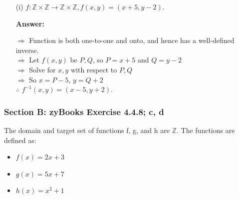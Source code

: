 \documentclass[14pt]{extreport}
\newcommand{\answer}[0]{\medskip \textbf{Answer:} \medskip}
\begin{document}
\begin{enumerate}
        \answer
        
        $\Rightarrow$ Function is both one-to-one and onto, and hence has a well-defined inverse.\\
        $\Rightarrow$ $f^{-1}(x) =$ The inverse output is obtained by simply taking the input string and reversing, which is the same as the function itself.\\
        $\therefore$ $f^{-1} = f$.
        \newline
        \\
        \\
        \\
        
        
    \item[(i)] $f:\mathbb{Z} \times \mathbb{Z} \rightarrow \mathbb{Z} \times \mathbb{Z}, f(x,y) = (x+5, y-2)$. 
        
        \answer
        
        $\Rightarrow$ Function is both one-to-one and onto, and hence has a well-defined inverse.\\
        $\Rightarrow$ Let $f(x,y)$ be $P,Q$, so $P=x+5$ and $Q=y-2$\\
        $\Rightarrow$ Solve for $x, y$ with respect to $P, Q$\\
        $\Rightarrow$ So $x=P-5$, $y=Q+2$\\
        $\therefore$ $f^{-1}(x,y) = (x-5, y+2)$. 
        \newline
\end{enumerate}
    
\subsubsection*{Section B: zyBooks Exercise 4.4.8; c, d}

The domain and target set of functions f, g, and h are $\mathbb{Z}$. The functions are defined as: 
\begin{itemize}
    \item $f(x) = 2x+3$
    \item $g(x) = 5x+7$
    \item$h(x) = x^2+1$
\end{itemize}
    
\end{document}
